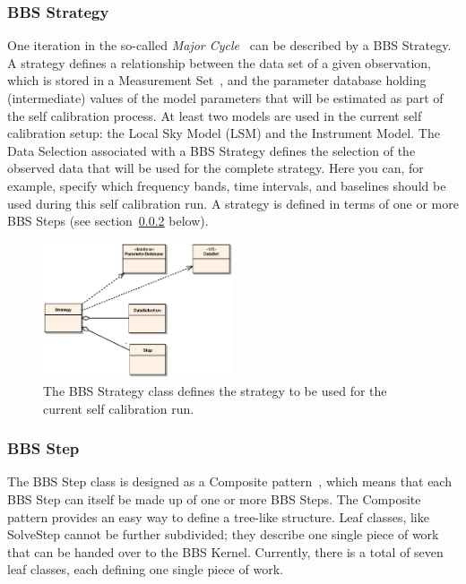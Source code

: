 \documentclass[10pt]{lofar}
\begin{document}
\subsubsection{BBS Strategy}
\label{subsubsec:design-strategy}
One iteration in the so-called \emph{Major 
Cycle}~\cite[sec.~4.1]{LOFAR-ASTRON-SDD-050} can be described by a BBS
Strategy. A strategy defines a relationship between the data set of a given
observation, which is stored in a Measurement Set~\cite{aips++note229}, and the parameter database
holding (intermediate) values of the model parameters that will be estimated
as part of the self calibration process. At least two models are used in the
current self calibration setup: the Local Sky Model (LSM) and the Instrument
Model. The Data Selection associated with a BBS Strategy defines the selection
of the observed data that will be used for the complete strategy. Here you
can, for example, specify which frequency bands, time intervals, and baselines
should be used during this self calibration run. A strategy is defined in
terms of one or more BBS Steps (see section~\ref{subsubsec:design-step}
below).

\begin{figure}[!ht]
\centering
\includegraphics[width=0.5\textwidth]{images/bbs-strategy-class-diagram}
\caption{The BBS Strategy class defines the strategy to be used for the
current self calibration run.}
\label{fig:bbsstrategy}
\end{figure}

\subsubsection{BBS Step}
\label{subsubsec:design-step}
The BBS Step class is designed as a Composite pattern~\cite{Gamma1995}, which means that
each BBS Step can itself be made up of one or more BBS Steps. The Composite
pattern provides an easy way to define a tree-like structure. Leaf classes,
like SolveStep cannot be further subdivided; they describe one single
piece of work that can be handed over to the BBS Kernel. Currently, there is a
total of seven leaf classes, each defining one single piece of work.
\end{document}
